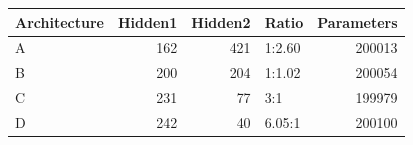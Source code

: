 \begin{tabular}{lrrlr}
\toprule
Architecture & Hidden1 & Hidden2 & Ratio & Parameters \\
\midrule
A & 162 & 421 & 1:2.60 & 200013 \\
B & 200 & 204 & 1:1.02 & 200054 \\
C & 231 & 77 & 3:1 & 199979 \\
D & 242 & 40 & 6.05:1 & 200100 \\
\bottomrule
\end{tabular}
